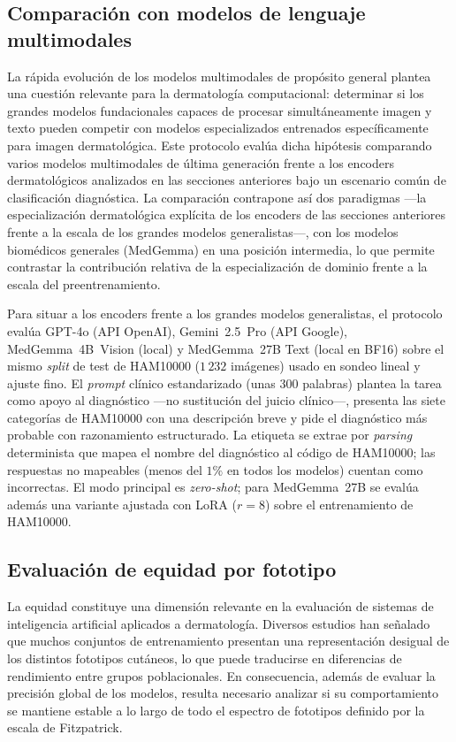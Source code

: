 \subsection{Comparación con modelos de lenguaje multimodales}
\label{sec:llm}

La rápida evolución de los modelos multimodales de propósito general
plantea una cuestión relevante para la dermatología computacional:
determinar si los grandes modelos fundacionales capaces de procesar
simultáneamente imagen y texto pueden competir con modelos
especializados entrenados específicamente para imagen dermatológica.
Este protocolo evalúa dicha hipótesis comparando varios modelos
multimodales de última generación frente a los encoders
dermatológicos analizados en las secciones anteriores bajo un
escenario común de clasificación diagnóstica. La comparación
contrapone así dos paradigmas ---la especialización dermatológica
explícita de los encoders de las secciones anteriores frente a la
escala de los grandes modelos generalistas---, con los modelos
biomédicos generales (MedGemma) en una posición intermedia, lo que
permite contrastar la contribución relativa de la especialización de
dominio frente a la escala del preentrenamiento.

Para situar a los encoders frente a los grandes modelos
generalistas, el protocolo evalúa GPT-4o (API OpenAI),
Gemini~2.5~Pro (API Google), MedGemma~4B~Vision (local) y
MedGemma~27B Text (local en BF16) sobre el mismo \emph{split} de
test de HAM10000 ($1\,232$ imágenes) usado en sondeo lineal y
ajuste fino. El \emph{prompt} clínico estandarizado (unas $300$
palabras) plantea la tarea como apoyo al diagnóstico —no
sustitución del juicio clínico—, presenta las siete categorías de
HAM10000 con una descripción breve y pide el diagnóstico más
probable con razonamiento estructurado. La etiqueta se extrae por
\emph{parsing} determinista que mapea el nombre del diagnóstico al
código de HAM10000; las respuestas no mapeables (menos del $1\%$
en todos los modelos) cuentan como incorrectas. El modo principal es
\emph{zero-shot}; para MedGemma~27B se evalúa además una variante
ajustada con LoRA ($r = 8$) sobre el entrenamiento de HAM10000.

\subsection{Evaluación de equidad por fototipo}
\label{sec:equidad}

La equidad constituye una dimensión relevante en la evaluación de
sistemas de inteligencia artificial aplicados a dermatología.
Diversos estudios han señalado que muchos conjuntos de entrenamiento
presentan una representación desigual de los distintos fototipos
cutáneos, lo que puede traducirse en diferencias de rendimiento
entre grupos poblacionales. En consecuencia, además de evaluar la
precisión global de los modelos, resulta necesario analizar si su
comportamiento se mantiene estable a lo largo de todo el espectro de
fototipos definido por la escala de Fitzpatrick.


